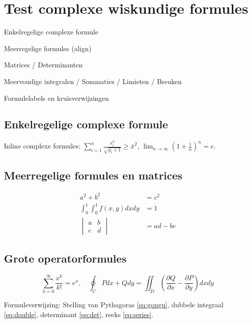 \documentclass[nl]{../../elegantbook}
\begin{document}
\chapter{Test complexe wiskundige formules}
\begin{introduction}
\item Enkelregelige complexe formule
\item Meerregelige formules (align)
\item Matrices / Determinanten
\item Meervoudige integralen / Sommaties / Limieten / Breuken
\item Formulelabels en kruisverwijzingen
\end{introduction}

\section{Enkelregelige complexe formule}
Inline complexe formules: $\sum_{i=1}^n \frac{x_i^2}{\sqrt{y_i+1}} \geq \bar{x}^2$, $\lim_{n\to\infty} \left(1+\frac{1}{n}\right)^n = e$.

\section{Meerregelige formules en matrices}
\begin{align}
a^2 + b^2 &= c^2 \label{eq:gougu} \\
\int_{0}^{1}\int_{0}^{1} f(x,y) dxdy &= 1 \label{eq:double} \\
\begin{vmatrix}
a & b \\
c & d
\end{vmatrix} &= ad-bc \label{eq:det}
\end{align}

\section{Grote operatorformules}
\begin{equation}\label{eq:series}
\sum_{k=0}^{\infty} \frac{x^k}{k!} = e^x,\quad \oint_{C} Pdx+Qdy = \iint_{D}\left(\frac{\partial Q}{\partial x}-\frac{\partial P}{\partial y}\right)dxdy
\end{equation}

Formuleverwijzing: Stelling van Pythagoras \eqref{eq:gougu}, dubbele integraal \eqref{eq:double}, determinant \eqref{eq:det}, reeks \eqref{eq:series}.
\end{document}
